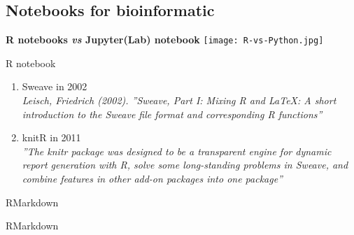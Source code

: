 \subsection*{Notebooks for bioinformatic}
\begin{frame}
\centering\textbf{R notebooks \emph{vs} Jupyter(Lab) notebook}
\newline
\texttt{[image: R-vs-Python.jpg]}
\end{frame}

\begin{frame}[<+->]{R notebook}
\begin{enumerate}
	\item Sweave in 2002 \\
\emph{Leisch, Friedrich (2002). ”Sweave, Part I: Mixing R and LaTeX: A short
introduction to the Sweave ﬁle format and corresponding R functions”}
	\item knitR in 2011 \\
\emph{”The knitr package was designed to be a transparent engine for dynamic report
generation with R, solve some long-standing problems in Sweave, and combine
features in other add-on packages into one package”}
\end{enumerate}
\end{frame}

\begin{frame}{RMarkdown}
\newline
{}
\end{frame}

\begin{frame}{RMarkdown}
\end{frame}

